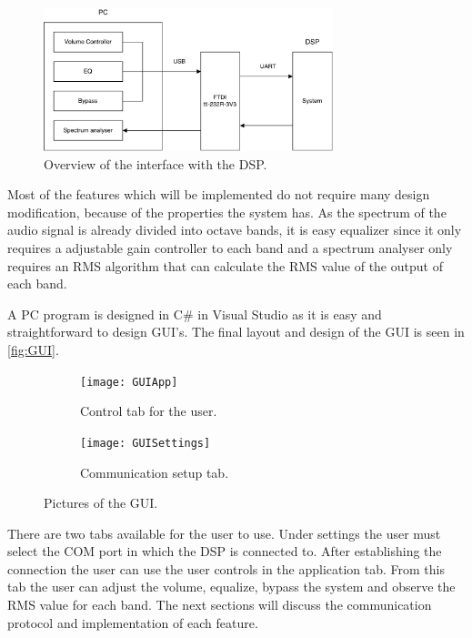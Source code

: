\begin{figure}[H]
\centering
\includegraphics[width=0.75\textwidth]{figures/communicationBlock.pdf}
\caption{Overview of the interface with the DSP.}
\label{fig:communicationBlock}
\end{figure}

Most of the features which will be implemented do not require many design modification, because of the properties the system has. As the spectrum of the audio signal is already divided into octave bands, it is easy equalizer since it only requires a adjustable gain controller to each band and a spectrum analyser only requires an RMS algorithm that can calculate the RMS value of the output of each band. 

A PC program is designed in C\# in Visual Studio as it is easy and straightforward to design GUI's. The final layout and design of the GUI is seen in \autoref{fig:GUI}.

\begin{figure}[H]
\centering
\begin{subfigure}[t]{0.85\textwidth}
\texttt{[image: GUIApp]}
	\caption{Control tab for the user.}
	\label{fig:GUIApp}
\end{subfigure}
\hspace{6mm} 
\begin{subfigure}[t]{0.85\textwidth}
\texttt{[image: GUISettings]}
	\caption{Communication setup tab.}
	\label{fig:GUISettings}
\end{subfigure}
\caption{Pictures of the GUI.}
\label{fig:GUI}
\end{figure}

There are two tabs available for the user to use. Under settings the user must select the COM port in which the DSP is connected to. After establishing the connection the user can use the user controls in the application tab. From this tab the user can adjust the volume, equalize, bypass the system and observe the RMS value for each band. The next sections will discuss the communication protocol and implementation of each feature.


